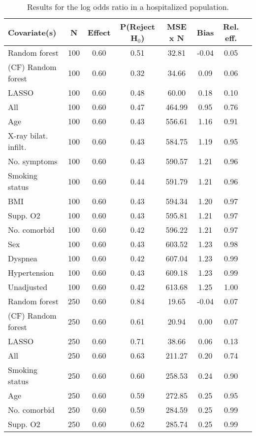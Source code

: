 \documentclass{article}
\begin{document}
{\tabcolsep=6pt  %
\begin{longtable}{lccccccc}
\caption{Results for the log odds ratio in a hospitalized population.} \\
Covariate(s) & N & Effect & P(Reject H$_0$) & MSE x N & Bias & Rel. eff.\\ \midrule
Random forest & 100 & 0.60 & 0.51 &  32.81 & -0.04 & 0.05 \\ 
(CF) Random forest & 100 & 0.60 & 0.32 &  34.66 &  0.09 & 0.06 \\ 
LASSO & 100 & 0.60 & 0.48 &  60.00 &  0.18 & 0.10 \\ 
All & 100 & 0.60 & 0.47 & 464.99 &  0.95 & 0.76 \\ 
Age & 100 & 0.60 & 0.43 & 556.61 &  1.16 & 0.91 \\ 
X-ray bilat. infilt. & 100 & 0.60 & 0.43 & 584.75 &  1.19 & 0.95 \\ 
No. symptoms & 100 & 0.60 & 0.43 & 590.57 &  1.21 & 0.96 \\ 
Smoking status & 100 & 0.60 & 0.44 & 591.79 &  1.21 & 0.96 \\ 
BMI & 100 & 0.60 & 0.43 & 594.34 &  1.20 & 0.97 \\ 
Supp. O2 & 100 & 0.60 & 0.43 & 595.81 &  1.21 & 0.97 \\ 
No. comorbid & 100 & 0.60 & 0.42 & 596.22 &  1.21 & 0.97 \\ 
Sex & 100 & 0.60 & 0.43 & 603.52 &  1.23 & 0.98 \\ 
Dyspnea & 100 & 0.60 & 0.42 & 607.04 &  1.23 & 0.99 \\ 
Hypertension & 100 & 0.60 & 0.43 & 609.18 &  1.23 & 0.99 \\ 
Unadjusted & 100 & 0.60 & 0.42 & 613.68 &  1.25 & 1.00 \\ \midrule() 
Random forest & 250 & 0.60 & 0.84 &  19.65 & -0.04 & 0.07 \\ 
(CF) Random forest & 250 & 0.60 & 0.61 &  20.94 &  0.00 & 0.07 \\ 
LASSO & 250 & 0.60 & 0.71 &  38.66 &  0.06 & 0.13 \\ 
All & 250 & 0.60 & 0.63 & 211.27 &  0.20 & 0.74 \\ 
Smoking status & 250 & 0.60 & 0.60 & 258.53 &  0.24 & 0.90 \\ 
Age & 250 & 0.60 & 0.59 & 272.85 &  0.25 & 0.95 \\ 
No. comorbid & 250 & 0.60 & 0.59 & 284.59 &  0.25 & 0.99 \\ 
Supp. O2 & 250 & 0.60 & 0.62 & 285.74 &  0.25 & 0.99 \\ 

\end{longtable}}
\end{document}
